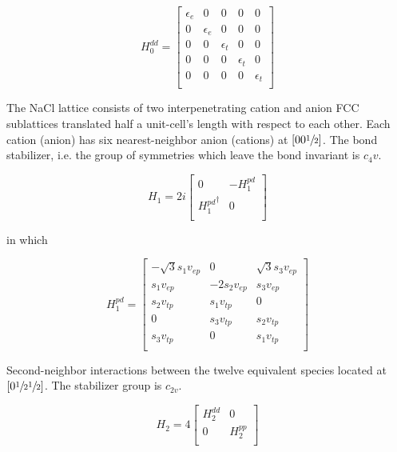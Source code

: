 \documentclass[preprint,showpacs,preprintnumbers,superscriptaddress,prb,floatfix,aps]{revtex4-1}
\begin{document}
\begin{equation}
H_0^{dd} =
\begin{bmatrix}
 \epsilon_{e} & 0 & 0 & 0 & 0 \\
 0 & \epsilon_{e} & 0 & 0 & 0 \\
 0 & 0 & \epsilon_{t} & 0 & 0 \\
 0 & 0 & 0 & \epsilon_{t} & 0 \\
 0 & 0 & 0 & 0 & \epsilon_{t} \\
\end{bmatrix}
\end{equation}

The NaCl lattice consists of two interpenetrating cation and anion FCC sublattices translated half a unit-cell's length with respect to each other. Each cation (anion) has six nearest-neighbor anion (cations) at $\left[0 0 \sfrac{1}{2}\right]$. The bond stabilizer, i.e. the group of symmetries which leave the bond invariant is $c_4v$.


\begin{equation}
H_1 = 2i
\begin{bmatrix}
0                  & -H_1^{pd} \\
{H_1^{pd}}^\dagger &  0        \\
\end{bmatrix}
\end{equation}

in which 

\begin{equation}
H_1^{pd} = 
\begin{bmatrix}
-\sqrt{3} s_1 v_{ep} & 0            & \sqrt{3} s_3 v_{ep}  \\ %
 s_1 v_{ep}          &-2 s_2 v_{ep} &  s_3 v_{ep}          \\ %
 s_2 v_{tp}          &  s_1 v_{tp}  & 0                    \\
0                    &  s_3 v_{tp}  &  s_2 v_{tp}          \\
 s_3 v_{tp}          & 0            &  s_1 v_{tp}          \\
\end{bmatrix}
\end{equation}

Second-neighbor interactions between the twelve equivalent species located at $\left[0\sfrac{1}{2}\sfrac{1}{2}\right]$. The stabilizer group is $c_{2v}$.


\begin{equation}
H_2 = 4
\begin{bmatrix}
H_2^{dd} & 0 \\
 0 & H_2^{pp} \\
\end{bmatrix}
\end{equation}
\end{document}
